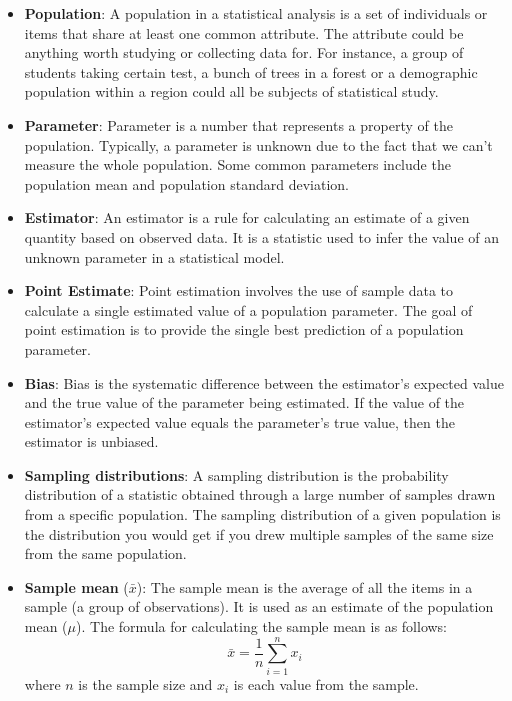 \documentclass{article}
\begin{document}
\begin{itemize}

\item \textbf{Population}: A population in a statistical analysis is a set of individuals or items that share at least one common attribute. The attribute could be anything worth studying or collecting data for. For instance, a group of students taking certain test, a bunch of trees in a forest or a demographic population within a region could all be subjects of statistical study.

\item \textbf{Parameter}: Parameter is a number that represents a property of the population. Typically, a parameter is unknown due to the fact that we can't measure the whole population. Some common parameters include the population mean and population standard deviation.

\item \textbf{Estimator}: An estimator is a rule for calculating an estimate of a given quantity based on observed data. It is a statistic used to infer the value of an unknown parameter in a statistical model.

\item \textbf{Point Estimate}: Point estimation involves the use of sample data to calculate a single estimated value of a population parameter. The goal of point estimation is to provide the single best prediction of a population parameter.

\item \textbf{Bias}: Bias is the systematic difference between the estimator's expected value and the true value of the parameter being estimated. If the value of the estimator's expected value equals the parameter's true value, then the estimator is unbiased.

\item \textbf{Sampling distributions}: A sampling distribution is the probability distribution of a statistic obtained through a large number of samples drawn from a specific population. The sampling distribution of a given population is the distribution you would get if you drew multiple samples of the same size from the same population.

\item \textbf{Sample mean} ($\bar{x}$): The sample mean is the average of all the items in a sample (a group of observations). It is used as an estimate of the population mean ($\mu$). The formula for calculating the sample mean is as follows:
\[ \bar{x} = \frac{1}{n} \sum_{i=1}^n x_i \]
where $n$ is the sample size and $x_i$ is each value from the sample.


\end{itemize}
\end{document}
